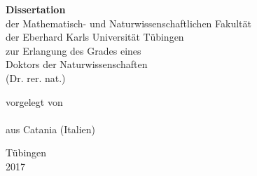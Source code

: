 \begin{titlepage}
\makeatletter %
\setlength{\parskip}{0pt}
\centering
\large
%
\linespread{1.5}\selectfont

\vspace*{-2cm}

{\huge \bfseries
  \@title%
  \par%
}

\vspace{4cm}

{\bfseries Dissertation}\\
der Mathematisch- und Naturwissenschaftlichen Fakult\"at\\
der Eberhard Karls Universit\"at T\"ubingen\\
zur Erlangung des Grades eines\\
Doktors der Naturwissenschaften\\
(Dr. rer. nat.)

\vspace{4 cm}

vorgelegt von \\
\@author \\
aus Catania (Italien)

\vspace{2 cm}

T\"ubingen\\
2017

\vfill
\end{titlepage}

